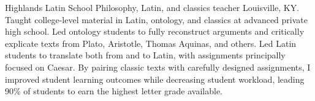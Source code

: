 {Highlands Latin School}
{Philosophy, Latin, and classics teacher}
{Louisville, KY. Taught college-level material in Latin, ontology, and classics at advanced private high school. 
	Led ontology students to fully reconstruct arguments 
	and critically explicate texts from Plato, Aristotle, Thomas Aquinas, and others. 
	Led Latin students to translate both from and to Latin, 
	with assignments principally focused on Caesar. 
	By pairing classic texts with carefully designed assignments, 
	I improved student learning outcomes 
	while decreasing student workload, 
	leading 90\% of students to earn the highest letter grade available.}

